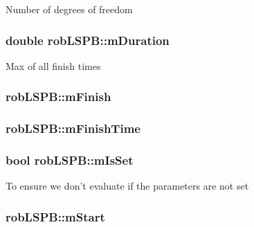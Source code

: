Number of degrees of freedom \hypertarget{classrob_l_s_p_b_a79217b19223e3b08ca514250ce67bc4d}{
\subsubsection[{m\-Duration}]{\setlength{\rightskip}{0pt plus 5cm}double rob\-L\-S\-P\-B\-::m\-Duration\hspace{0.3cm}{\ttfamily [protected]}}}\label{classrob_l_s_p_b_a79217b19223e3b08ca514250ce67bc4d}
Max of all finish times \hypertarget{classrob_l_s_p_b_add5bdcfe3d89555a15bb2741c63ade5a}{
\subsubsection[{m\-Finish}]{ rob\-L\-S\-P\-B\-::m\-Finish\hspace{0.3cm}{\ttfamily [protected]}}}\label{classrob_l_s_p_b_add5bdcfe3d89555a15bb2741c63ade5a}
\hypertarget{classrob_l_s_p_b_aa1e0ff251a01dca4a598caa294e2166d}{
\subsubsection[{m\-Finish\-Time}]{ rob\-L\-S\-P\-B\-::m\-Finish\-Time\hspace{0.3cm}{\ttfamily [protected]}}}\label{classrob_l_s_p_b_aa1e0ff251a01dca4a598caa294e2166d}
\hypertarget{classrob_l_s_p_b_a754306ed9e75319fdd5752dc564b1b85}{
\subsubsection[{m\-Is\-Set}]{\setlength{\rightskip}{0pt plus 5cm}bool rob\-L\-S\-P\-B\-::m\-Is\-Set\hspace{0.3cm}{\ttfamily [protected]}}}\label{classrob_l_s_p_b_a754306ed9e75319fdd5752dc564b1b85}
To ensure we don't evaluate if the parameters are not set \hypertarget{classrob_l_s_p_b_ab1ad2d98754f2e0461f7853997293ea5}{
\subsubsection[{m\-Start}]{ rob\-L\-S\-P\-B\-::m\-Start\hspace{0.3cm}{\ttfamily [protected]}}}\label{classrob_l_s_p_b_ab1ad2d98754f2e0461f7853997293ea5}
